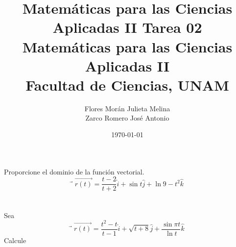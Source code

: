 \documentclass[12pt]{article}
\title{Matemáticas para las Ciencias Aplicadas II}
\title{
	\textbf{Tarea 02} \\
	\vspace{1ex}
	\large Matemáticas para las Ciencias Aplicadas II \\
	Facultad de Ciencias, UNAM}
\date{\today}
\author{Flores Morán Julieta Melina \\ Zarco Romero José Antonio}
\begin{document}
\maketitle

\section{}

Proporcione el dominio de la función vectorial.
$$
⃗\vec{r(t)}
=
\frac{t-2}{t+2}\hat{i}
+
\sin{t}\hat{j}
+
\ln{9-t^2}\hat{k}
$$

\section{}

Sea
$$
⃗\vec{r(t)}
=
\frac{t^2-t}{t-1}\hat{i}
+
\sqrt{t+8}\hat{j}
+
\frac{\sin{\pi t}}{\ln{t}}\hat{k}
$$
Calcule
\end{document}
